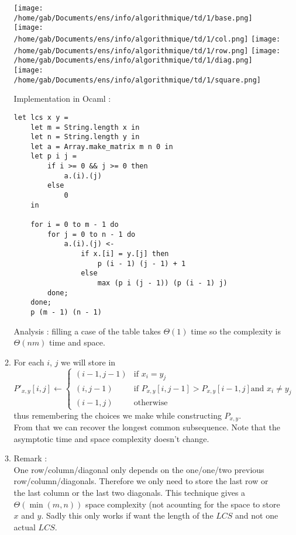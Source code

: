 \documentclass[12pt,4paper]{article}
\newenvironment{code}{%
\begin{mdframed}[linecolor=Green,innerrightmargin=30pt,innerleftmargin=30pt,
backgroundcolor=Black!5,
skipabove=10pt,skipbelow=10pt,roundcorner=5pt,
splitbottomskip=6pt,splittopskip=12pt]
}{%
\end{mdframed}
}
\begin{document}
\begin{enumerate}
\begin{enumerate}
\begin{center}
\texttt{[image: /home/gab/Documents/ens/info/algorithmique/td/1/base.png]}
\texttt{[image: /home/gab/Documents/ens/info/algorithmique/td/1/col.png]}
\texttt{[image: /home/gab/Documents/ens/info/algorithmique/td/1/row.png]}
\texttt{[image: /home/gab/Documents/ens/info/algorithmique/td/1/diag.png]}
\texttt{[image: /home/gab/Documents/ens/info/algorithmique/td/1/square.png]}
\end{center}

Implementation in Ocaml :\\
\begin{code}
\begin{verbatim}
let lcs x y =
    let m = String.length x in
    let n = String.length y in
    let a = Array.make_matrix m n 0 in
    let p i j =
        if i >= 0 && j >= 0 then
            a.(i).(j)
        else
            0
    in

    for i = 0 to m - 1 do
        for j = 0 to n - 1 do
            a.(i).(j) <-
                if x.[i] = y.[j] then
                    p (i - 1) (j - 1) + 1
                else
                    max (p i (j - 1)) (p (i - 1) j)
        done;
    done;
    p (m - 1) (n - 1)
\end{verbatim}
\end{code}

Analysis : filling a case of the table takes $\Theta(1)$ time so the complexity
is $\Theta(nm)$ time and space.

\item For each $i$, $j$ we will store in $
P'_{x, y}[i, j] \leftarrow
\left\{ \begin{array}{ll}
		(i - 1, j - 1) & \mbox{if } x_i = y_j\\
		(i, j - 1) & \mbox{if } P_{x, y}[i, j - 1] > P_{x, y}[i - 1, j]
\mbox{and } x_i \neq y_j\\
		(i - 1, j) & \mbox{otherwise}
	\end{array}
\right.
$ thus remembering the choices we make while constructing $P_{x, y}$.
\\
From that we can recover the longest common subsequence. Note that the
asymptotic time and space complexity doesn't change.

\item Remark :\\One row/column/diagonal only depends on the one/one/two previous
row/column/diagonals. Therefore we only need to store the last row or the last
column or the last two diagonals. This technique gives a $\Theta(\min(m, n))$
space complexity (not acounting for the space to store $x$ and $y$. Sadly this
only works if want the length of the $LCS$ and not one actual $LCS$.
\end{enumerate}


\end{enumerate}
\end{document}
